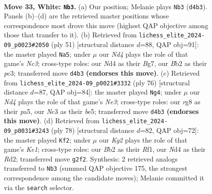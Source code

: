 \documentclass[11pt]{article}
\begin{document}
\clearpage

\begin{figure}[p]\centering
\begin{subfigure}{0.46\textwidth}\centering
\resizebox{\linewidth}{!}{%
\newchessgame
\chessboard[
  setfen={r2b2r1/1p1k1b1p/n5pP/p2pPp2/P2N4/2N3P1/1B4K1/R4R2 w - - 9 33},
  showmover=false,
  pgfstyle=straightmove, color=movearrow, markmove={d4-b3}
]}
\caption{}
\end{subfigure}\hfill
\begin{subfigure}{0.46\textwidth}\centering
\resizebox{\linewidth}{!}{%
\newchessgame
\chessboard[
  setfen={3rr1k1/pp3pb1/2n3pp/4P3/P1p5/2Pp2BP/1P1N1PP1/3RR1K1 b - - 1 26},
  showmover=false,
  pgfstyle=straightmove, color=movearrow, markmove={c6-a5}
]}
\caption{}
\end{subfigure}
\\[4pt]
\begin{subfigure}{0.46\textwidth}\centering
\resizebox{\linewidth}{!}{%
\newchessgame
\chessboard[
  setfen={3r4/1k1rn3/1p3p2/p2pb1p1/P7/2PRN1PP/1P3BK1/3R4 w - - 9 39},
  showmover=false,
  pgfstyle=straightmove, color=movearrow, markmove={e3-g4}
]}
\caption{}
\end{subfigure}\hfill
\begin{subfigure}{0.46\textwidth}\centering
\resizebox{\linewidth}{!}{%
\newchessgame
\chessboard[
  setfen={r2r1bk1/5p2/3P3p/5NpP/p3P1P1/1b6/p2RB3/4KR2 w - - 0 40},
  showmover=false,
  pgfstyle=straightmove, color=movearrow, markmove={e1-f2}
]}
\caption{}
\end{subfigure}
\caption{\textbf{Move 33, White: \texttt{Nb3}.} (a) Our position; Melanie plays \texttt{Nb3} (\texttt{d4b3}). Panels (b)--(d) are the retrieved master positions whose correspondence most drove this move (highest QAP objective among those that transfer to it). (b) Retrieved from \texttt{lichess\_elite\_2024-09\_p0023\#2050} (ply 51) [structural distance $d$=88, QAP obj=91]: the master played \texttt{Na5}; under $\mu$ our \emph{Nd4} plays the role of that game's \emph{Nc3}; cross-type roles: our \emph{N}d4 as their \emph{B}g7, our \emph{B}b2 as their \emph{p}c3; transferred move \texttt{d4b3} \textbf{(endorses this move)}. (c) Retrieved from \texttt{lichess\_elite\_2024-09\_p0021\#3332} (ply 76) [structural distance $d$=87, QAP obj=84]: the master played \texttt{Ng4}; under $\mu$ our \emph{Nd4} plays the role of that game's \emph{Ne3}; cross-type roles: our \emph{r}g8 as their \emph{p}a5, our \emph{N}c3 as their \emph{b}e5; transferred move \texttt{d4b3} \textbf{(endorses this move)}. (d) Retrieved from \texttt{lichess\_elite\_2024-09\_p0031\#3243} (ply 78) [structural distance $d$=82, QAP obj=72]: the master played \texttt{Kf2}; under $\mu$ our \emph{Kg2} plays the role of that game's \emph{Ke1}; cross-type roles: our \emph{B}b2 as their \emph{R}f1, our \emph{N}d4 as their \emph{R}d2; transferred move \texttt{g2f2}. Synthesis: 2 retrieved analogs transferred to \texttt{Nb3} (summed QAP objective 175, the strongest correspondence among the candidate moves); Melanie committed it via the \texttt{search} selector.}
\label{fig:thought-m64}
\end{figure}
\end{document}
